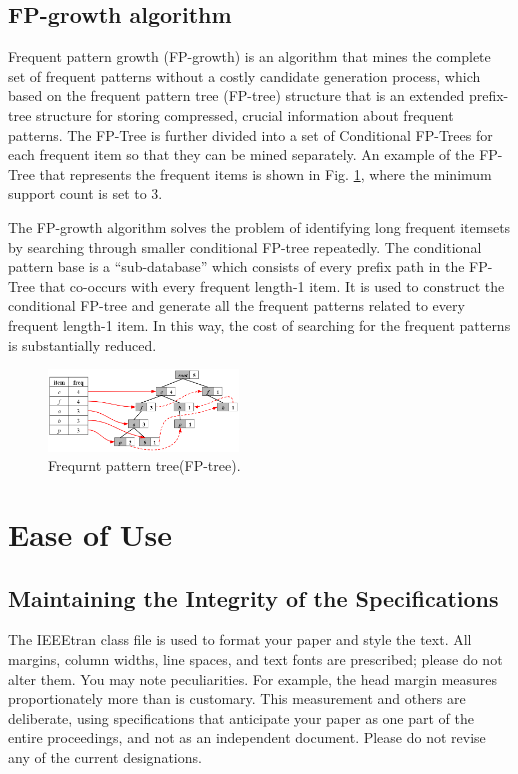 \documentclass[conference]{IEEEtran}
\begin{document}
\subsection{FP-growth algorithm}
Frequent pattern growth (FP-growth)\cite{fp} is an algorithm that mines the complete set of frequent patterns without a costly candidate generation process, which based on the frequent pattern tree (FP-tree) structure that is an extended prefix-tree structure for storing compressed, crucial information about frequent patterns. The FP-Tree is further divided into a set of Conditional FP-Trees for each frequent item so that they can be mined separately. An example of the FP-Tree that represents the frequent items is shown in Fig. \ref{fptree}, where the minimum support count is set to 3.


The FP-growth algorithm solves the problem of identifying long frequent itemsets by searching through smaller conditional FP-tree repeatedly. The conditional pattern base is a “sub-database” which consists of every prefix path in the FP-Tree that co-occurs with every frequent length-1 item. It is used to construct the conditional FP-tree and generate all the frequent patterns related to every frequent length-1 item. In this way, the cost of searching for the frequent patterns is substantially reduced.

\begin{figure}[htbp]
\centerline{\includegraphics[width=0.45\textwidth]{fptree.png}}
\caption{Frequrnt pattern tree(FP-tree).}
\label{fptree}
\end{figure}

\section{Ease of Use}

\subsection{Maintaining the Integrity of the Specifications}

The IEEEtran class file is used to format your paper and style the text. All margins, 
column widths, line spaces, and text fonts are prescribed; please do not 
alter them. You may note peculiarities. For example, the head margin
measures proportionately more than is customary. This measurement 
and others are deliberate, using specifications that anticipate your paper 
as one part of the entire proceedings, and not as an independent document. 
Please do not revise any of the current designations.
\end{document}
